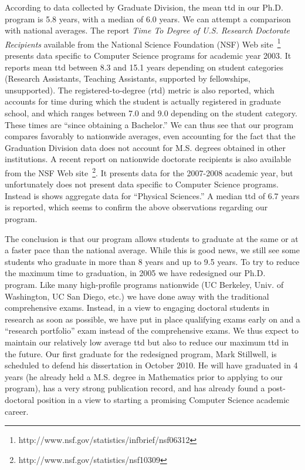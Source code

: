 \documentclass[12pt]{article}
\begin{document}
According to data collected by Graduate Division, the mean ttd in our
Ph.D. program is 5.8 years, with a median of 6.0 years. We can attempt
a comparison with national averages. The report \emph{Time
To Degree of U.S. Research Doctorate Recipients} available from the
National Science Foundation (NSF) Web
site~\footnote{http://www.nsf.gov/statistics/infbrief/nsf06312}
presents data specific to Computer Science programs for academic year
2003. It reports mean ttd between 8.3 and 15.1 years depending on
student categories (Research Assistants, Teaching Assistants,
supported by fellowships, unsupported). The registered-to-degree (rtd)
metric is also reported, which accounts for time during which the
student is actually registered in graduate school, and which ranges
between 7.0 and 9.0 depending on the student category. These times are
``since obtaining a Bachelor.'' We can thus see that our program
compares favorably to nationwide averages, even accounting for the
fact that the Graduation Division data does not account for M.S.
degrees obtained in other institutions.  A recent report on nationwide
doctorate recipients is also available from the NSF Web
site~\footnote{http://www.nsf.gov/statistics/nsf10309}. It presents
data for the 2007-2008 academic year, but unfortunately does not
present data specific to Computer Science programs. Instead is shows
aggregate data for ``Physical Sciences.'' A median ttd of 6.7 years is
reported, which seems to confirm the above observations regarding our program.

The conclusion is that our program allows students to graduate at the
same or at a faster pace than the national average.  While this is good
news, we still see some students who graduate in more than 8 years and up
to 9.5 years. To try to reduce the maximum time to graduation, in 2005
we have redesigned our Ph.D. program.  Like many high-profile programs
nationwide (UC Berkeley, Univ.  of Washington, UC San Diego, etc.) we
have done away with the traditional comprehensive exams.  Instead, in
a view to engaging doctoral students in research as soon as possible,
we have put in place qualifying exams early on and a ``research
portfolio'' exam instead of the comprehensive exams. We thus expect to
maintain our relatively low average ttd but also to reduce our maximum
ttd in the future. Our first graduate for the redesigned program, Mark
Stillwell, is scheduled to defend his dissertation in October 2010. He
will have graduated in 4 years (he already held a M.S. degree in
Mathematics prior to applying to our program), has a very strong
publication record, and has already found a post-doctoral position in
a view to starting a promising Computer Science academic career.
\end{document}
